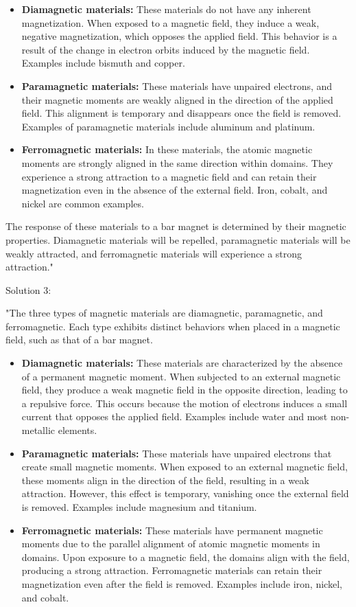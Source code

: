 \begin{itemize}
    \item \textbf{Diamagnetic materials:} These materials do not have any inherent magnetization. When exposed to a magnetic field, they induce a weak, negative magnetization, which opposes the applied field. This behavior is a result of the change in electron orbits induced by the magnetic field. Examples include bismuth and copper.
    \item \textbf{Paramagnetic materials:} These materials have unpaired electrons, and their magnetic moments are weakly aligned in the direction of the applied field. This alignment is temporary and disappears once the field is removed. Examples of paramagnetic materials include aluminum and platinum.
    \item \textbf{Ferromagnetic materials:} In these materials, the atomic magnetic moments are strongly aligned in the same direction within domains. They experience a strong attraction to a magnetic field and can retain their magnetization even in the absence of the external field. Iron, cobalt, and nickel are common examples.
\end{itemize}

The response of these materials to a bar magnet is determined by their magnetic properties. Diamagnetic materials will be repelled, paramagnetic materials will be weakly attracted, and ferromagnetic materials will experience a strong attraction."

Solution 3: 

"The three types of magnetic materials are diamagnetic, paramagnetic, and ferromagnetic. Each type exhibits distinct behaviors when placed in a magnetic field, such as that of a bar magnet.

\begin{itemize}
    \item \textbf{Diamagnetic materials:} These materials are characterized by the absence of a permanent magnetic moment. When subjected to an external magnetic field, they produce a weak magnetic field in the opposite direction, leading to a repulsive force. This occurs because the motion of electrons induces a small current that opposes the applied field. Examples include water and most non-metallic elements.
    \item \textbf{Paramagnetic materials:} These materials have unpaired electrons that create small magnetic moments. When exposed to an external magnetic field, these moments align in the direction of the field, resulting in a weak attraction. However, this effect is temporary, vanishing once the external field is removed. Examples include magnesium and titanium.
    \item \textbf{Ferromagnetic materials:} These materials have permanent magnetic moments due to the parallel alignment of atomic magnetic moments in domains. Upon exposure to a magnetic field, the domains align with the field, producing a strong attraction. Ferromagnetic materials can retain their magnetization even after the field is removed. Examples include iron, nickel, and cobalt.
\end{itemize}

